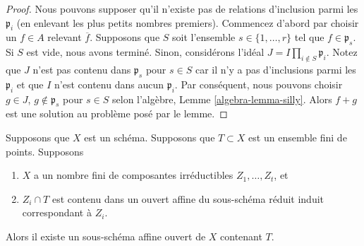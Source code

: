 \begin{proof}
Nous pouvons supposer qu'il n'existe pas de relations d'inclusion parmi
les $\mathfrak p_i$ (en enlevant les plus petits nombres premiers).
Commencez d'abord par choisir un $f \in A$ relevant $\overline{f}$.
Supposons que $S$ soit l'ensemble $s \in \{1, \ldots, r\}$ tel que $f
\in \mathfrak p_s$. Si $S$ est vide, nous avons terminé. Sinon,
considérons l'idéal $J = I \prod_{i \not \in S} \mathfrak p_i$. Notez que
$J$ n'est pas contenu dans $\mathfrak p_s$ pour $s \in S$ car il n'y a
pas d'inclusions parmi les $\mathfrak p_i$ et que $I$ n'est contenu dans
aucun $\mathfrak p_i$. Par conséquent, nous pouvons choisir $g \in J$, $g
\not \in \mathfrak p_s$ pour $s \in S$ selon l'algèbre, Lemme
\ref{algebra-lemma-silly}. Alors $f + g$ est une solution au problème posé par le lemme.
\end{proof}

\begin{lemma}
\label{lemma-finite-set-codim-1-points-in-affine-per-component}
Supposons que $X$ est un schéma. Supposons que $T \subset X$ est un ensemble fini de points. Supposons
\begin{enumerate}
\item $X$ a un nombre fini de composantes irréductibles $Z_1,
\ldots, Z_t$, et \item $Z_i \cap T$ est contenu dans un
ouvert affine du sous-schéma réduit induit correspondant à $Z_i$.
\end{enumerate}
Alors il existe un sous-schéma affine ouvert de $X$ contenant $T$.
\end{lemma}

